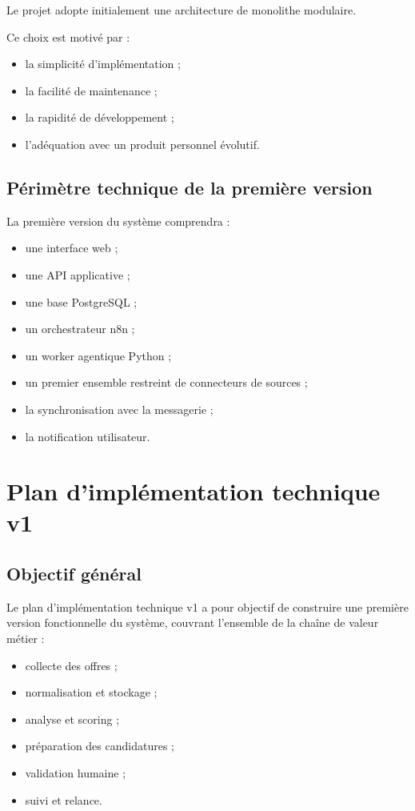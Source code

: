 \documentclass[11pt,a4paper]{article}
\begin{document}
Le projet adopte initialement une architecture de monolithe modulaire.

Ce choix est motivé par :

\begin{itemize}
    \item la simplicité d’implémentation ;
    \item la facilité de maintenance ;
    \item la rapidité de développement ;
    \item l’adéquation avec un produit personnel évolutif.
\end{itemize}

\subsection{Périmètre technique de la première version}

La première version du système comprendra :

\begin{itemize}
    \item une interface web ;
    \item une API applicative ;
    \item une base PostgreSQL ;
    \item un orchestrateur n8n ;
    \item un worker agentique Python ;
    \item un premier ensemble restreint de connecteurs de sources ;
    \item la synchronisation avec la messagerie ;
    \item la notification utilisateur.
\end{itemize}

\section{Plan d’implémentation technique v1}

\subsection{Objectif général}

Le plan d’implémentation technique v1 a pour objectif de construire une première version fonctionnelle du système, couvrant l’ensemble de la chaîne de valeur métier :

\begin{itemize}
    \item collecte des offres ;
    \item normalisation et stockage ;
    \item analyse et scoring ;
    \item préparation des candidatures ;
    \item validation humaine ;
    \item suivi et relance.
\end{itemize}
\end{document}
